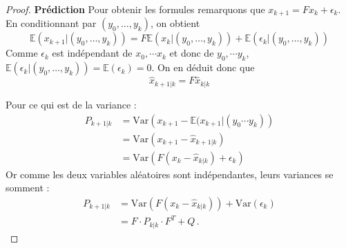 \documentclass[a4paper,12pt]{book}
\newcommand{\Var}{\text{Var}}
\newcommand{\E}{\mathbb{E}}
\begin{document}
\begin{proof}
\textbf{Prédiction}
Pour obtenir les formules remarquons que
$x_{k+1}=Fx_k+\epsilon_k.$
En conditionnant par $(y_0,\ldots,y_{k})$,
on obtient
\[ \E(x_{k+1}| (y_0,\ldots,y_{k})) = F\E(x_k|(y_0,\ldots,y_{k})) +\E(\epsilon_k|(y_0,\ldots,y_{k}))\]
Comme $\epsilon_k$ est indépendant de $x_0, \cdots x_k$ et donc de $y_0, \cdots y_k$,  $\E(\epsilon_k|(y_0,\ldots,y_{k}))=\E(\epsilon_k)=0$. On en déduit donc que
$$\hat{x}_{k+1|k}=F\hat{x}_{k|k}$$

Pour ce qui est de la variance :
\begin{align*}
P_{k+1|k}&= \Var\left(x_{k+1} - \E(x_{k+1}|( y_0 \cdots y_k)\right) \\
&= \Var(x_{k+1}-\hat{x}_{k+1|k})\\
&=  \Var(F(x_k-\hat{x}_{k|k}) +\epsilon_k)
\end{align*}
Or comme les deux variables aléatoires sont indépendantes, leurs variances se somment :
\begin{align*}
P_{k+1|k} &= \Var(F(x_k-\hat{x}_{k|k}) )+\Var(\epsilon_k)\\
&=F \cdot P_{k|k}\cdot F^T+Q\,.
\end{align*}




\end{proof}
\end{document}
